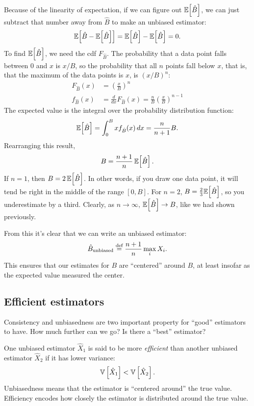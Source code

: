 Because of the linearity of expectation, if we can figure out $\mathbb{E}\!\left[{\hat{B}}\right]$, we can
just subtract that number away from $\hat{B}$ to make an unbiased estimator:
\begin{equation*}
    \mathbb{E}\!\left[{\hat{B} - \mathbb{E}\!\left[{\hat{B}}\right]}\right] = \mathbb{E}\!\left[{\hat{B}}\right] - \mathbb{E}\!\left[{\hat{B}}\right] = 0.
\end{equation*}
To find $\mathbb{E}\!\left[{\hat{B}}\right]$, we need the cdf $F_{\hat{B}}$. The probability
that a data point falls between 0 and $x$ is $x/B$, so the probability that all
$n$ points fall below $x$, that is, that the maximum of the data points is $x$,
is $(x/B)^n$:
\begin{align*}
    F_{\hat{B}}(x) &= \left( \frac{x}{B} \right)^n \\
    f_{\hat{B}}(x) &= \frac{d}{dx} F_{\hat{B}}(x) = \frac{n}{B} \left( \frac{x}{B} \right)^{n-1}
\end{align*}
The expected value is the integral over the probability distribution function:
\begin{equation}
    \mathbb{E}\!\left[{\hat{B}}\right] = \int_0^B x f_{\hat{B}}(x) \,dx = \frac{n}{n+1} B.
\end{equation}
Rearranging this result,
\begin{equation}
    B = \frac{n+1}{n} \, \mathbb{E}\!\left[{\hat{B}}\right].
\end{equation}
If $n=1$, then $B = 2 \, \mathbb{E}\!\left[{\hat{B}}\right]$. In other words, if you draw one
data point, it will tend be right in the middle of the range $[0, B]$. For
$n=2$, $B = \tfrac{2}{3} \mathbb{E}\!\left[{\hat{B}}\right]$, so you underestimate by a third.
Clearly, as $n \to \infty$, $\mathbb{E}\!\left[{\hat{B}}\right] \to B$, like we had shown
previously.

From this it's clear that we can write an unbiased estimator:
\begin{equation}
\hat{B}_\mathrm{unbiased} \stackrel{\text{def}}{=} \frac{n+1}{n} \max_i X_i.
\end{equation}
This ensures that our estimates for $B$ are ``centered'' around
$B$, at least insofar as the expected value measured the center.

\subsection{Efficient estimators}

Consistency and unbiasedness are two important property for ``good'' estimators
to have. How much further can we go? Is there a ``best'' estimator?

One unbiased estimator $\hat{X}_1$ is said to be more \emph{efficient} than another
unbiased estimator $\hat{X}_2$ if it has lower variance:
\begin{equation*}
    \mathbb{V}\left[{\hat{X}_1}\right] < \mathbb{V}\left[{\hat{X}_2}\right].
\end{equation*}
Unbiasedness means that the estimator is ``centered around'' the true value.
Efficiency encodes how closely the estimator is distributed around the true
value.

